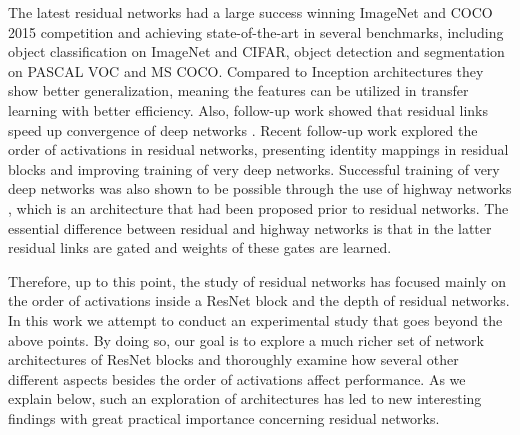 \documentclass{bmvc2k}
\begin{document}
The latest residual networks \cite{he2015deep}  had a large success winning ImageNet and COCO 2015 competition and achieving state-of-the-art in several benchmarks, including object classification on ImageNet and CIFAR, object detection and segmentation on PASCAL VOC and MS COCO. Compared to Inception architectures they show better generalization, meaning the features can be utilized in transfer learning with better efficiency. Also, follow-up work showed that residual links speed up convergence of deep networks \cite{inception-v4}. Recent follow-up work explored the order of activations in residual networks, presenting identity mappings in residual blocks \cite{basicblock2} and improving training of very deep networks. Successful training of very deep networks was also shown to be possible through the use of highway networks  \cite{highway}, which is an architecture  that had been proposed prior to residual networks. The essential difference between residual and highway networks is that in the latter residual links are gated and weights of these gates are learned.

Therefore, up to this point, the  study of residual networks has focused mainly  on the order of activations inside a ResNet block and the depth of residual networks.  In this work we attempt to conduct an experimental study that goes beyond the above points. By doing so, our goal is  to explore a much richer set of  network architectures  of  ResNet blocks and thoroughly examine how several other different aspects besides the order of activations affect performance. As we explain below, such an exploration of architectures has led to   new interesting findings  with great practical importance concerning residual networks.
\end{document}
